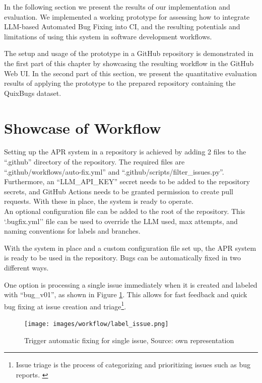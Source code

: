In the following section we present the results of our implementation and evaluation. We implemented a working prototype for assessing how to integrate LLM-based Automated Bug Fixing into \ac{CI}, and the resulting potentials and limitations of using this system in software development workflows.

The setup and usage of the prototype in a GitHub repository is demonstrated in the first part of this chapter by showcasing the resulting workflow in the GitHub Web \ac{UI}.
In the second part of this section, we present the quantitative evaluation results of applying the prototype to the prepared repository containing the QuixBugs dataset.

\section{Showcase of Workflow} \label{section:showcase}

Setting up the APR system in a repository is achieved by adding 2 files to the ``.github'' directory of the repository. The required files are ``.github/workflows/auto-fix.yml'' and ``.github/scripts/filter\_issues.py''. Furthermore, an ``LLM\_API\_KEY'' secret needs to be added to the repository secrets, and GitHub Actions needs to be granted permission to create pull requests. With these in place, the system is ready to operate.\\
An optional configuration file can be added to the root of the repository. This `.bugfix.yml'' file can be used to override the \ac{LLM} used, max attempts, and naming conventions for labels and branches.

With the system in place and a custom configuration file set up, the APR system is ready to be used in the repository. Bugs can be automatically fixed in two different ways.

One option is processing a single issue immediately when it is created and labeled with ``bug\_v01'', as shown in Figure \ref{fig:issue-trigger}. This allows for fast feedback and quick bug fixing at issue creation and triage\footnote{Issue triage is the process of categorizing and prioritizing issues such as bug reports. \cite{IssuesTriaging}}.

\begin{figure}[H]
    \centering
    \texttt{[image: images/workflow/label\_issue.png]}
    \caption{Trigger automatic fixing for single issue, Source: own representation}
    \label{fig:issue-trigger}
\end{figure}

